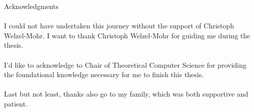 \thispagestyle{empty}

\newpage
\vspace*{20mm}

\begin{center}
    { Acknowledgments}
\end{center}

\vspace{10mm}
\paragraph{}
I could not have undertaken this journey without the support of Christoph Welzel-Mohr.
I want to thank Christoph Welzel-Mohr for guiding me during the thesis.
\paragraph{}
I’d like to acknowledge to Chair of Theoretical Computer Science
for providing the foundational knowledge necessary for me to finish this thesis.
\paragraph{}
Last but not least, thanks also go to my family, which was both supportive and patient.

{\raggedleft\vfill\itshape{}\par
}

\cleardoublepage{}